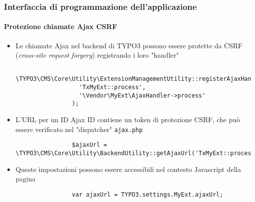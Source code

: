 \begin{frame}[fragile]
	\frametitle{Interfaccia di programmazione dell'applicazione}
	\framesubtitle{Protezione chiamate Ajax CSRF}

	\lstset{
		basicstyle=\tiny\ttfamily
	}

	\begin{itemize}
		\item Le chiamate Ajax nel backend di TYPO3 possono essere protette da CSRF (\textit{cross-site request forgery}) registrando i loro "handler"

			\begin{lstlisting}
				\TYPO3\CMS\Core\Utility\ExtensionManagementUtility::registerAjaxHandler(
				  'TxMyExt::process',
				  '\Vendor\MyExt\AjaxHandler->process'
				);
			\end{lstlisting}

		\item L'URL per un ID Ajax ID contiene un token di protezione CSRF, che può essere verificato nel "dispatcher" \texttt{ajax.php}

			\begin{lstlisting}
				$ajaxUrl = \TYPO3\CMS\Core\Utility\BackendUtility::getAjaxUrl('TxMyExt::process');
			\end{lstlisting}

		\item Queste impostazioni possono essere accessibili nel contesto Javascript della pagina

			\begin{lstlisting}
				var ajaxUrl = TYPO3.settings.MyExt.ajaxUrl;
			\end{lstlisting}

	\end{itemize}

\end{frame}



